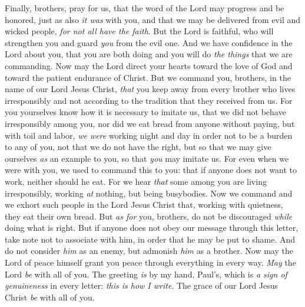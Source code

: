 \begin{biblechapter} %
 Finally, brothers, pray for us, that the word of the Lord may progress and be honored, just as also \textit{it was} with you,
\verse and that we may be delivered from evil and wicked people, \textit{for not all have the faith}.
\verse But the Lord is faithful, who will strengthen you and guard \textit{you} from the evil one.
\verse And we have confidence in the Lord about you, that you are both doing and you will do \textit{the things} that we are commanding.
\verse Now may the Lord direct your hearts toward the love of God and toward the patient endurance of Christ.
 But we command you, brothers, in the name of our Lord Jesus Christ, \textit{that} you keep away from every brother who lives irresponsibly and not according to the tradition that they received from us.
\verse For you yourselves know how it is necessary to imitate us, that we did not behave irresponsibly among you,
\verse nor did we eat bread from anyone without paying, but with toil and labor, \textit{we were} working night and day in order not to be a burden to any of you,
\verse not that we do not have the right, but so that we may give ourselves \textit{as} an example to you, so that \textit{you} may imitate us.
\verse For even when we were with you, we used to command this to you: that if anyone does not want to work, neither should he eat.
\verse For we hear \textit{that} some among you are living irresponsibly, working \textit{at} nothing, but being busybodies.
\verse Now we command and we exhort such people in the Lord Jesus Christ that, working with quietness, they eat their own bread.
\verse But \textit{as for} you, brothers, do not be discouraged \textit{while} doing what is right.
\verse But if anyone does not obey our message through this letter, take note not to associate with him, in order that he may be put to shame.
\verse And do not consider \textit{him} as an enemy, but admonish \textit{him} as a brother.
 Now may the Lord of peace himself grant you peace through everything in every way. \textit{May} the Lord \textit{be} with all of you.
\verse The greeting \textit{is} by my hand, Paul’s, which is \textit{a sign of genuineness} in every letter: \textit{this is how I write}.
\verse The grace of our Lord Jesus Christ \textit{be} with all of you.
\end{biblechapter}

